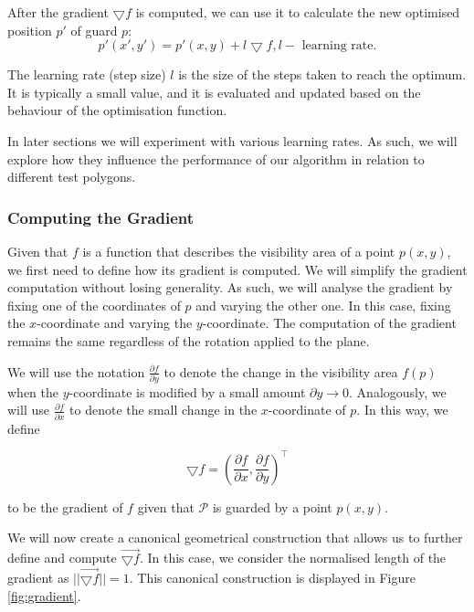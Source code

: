 After the gradient $\bigtriangledown f$ is computed, we can use it to calculate the new optimised position $p'$ of guard $p$: $$p'(x', y') = p'(x, y) + l\bigtriangledown f, l - \text{ learning rate}.$$

The learning rate (step size) $l$ is the size of the steps taken to reach the optimum. It is typically a small value, and it is evaluated and updated based on the behaviour of the optimisation function. 

In later sections we will experiment with various learning rates. As such, we will explore how they influence the performance of our algorithm in relation to different test polygons. 


\subsubsection{Computing the Gradient}

Given that $f$ is a function that describes the visibility area of a point $p(x, y)$, we first need to define how its gradient is computed. We will simplify the gradient computation without losing generality. As such, we will analyse the gradient by fixing one of the coordinates of $p$ and varying the other one. In this case, fixing the $x$-coordinate and varying the $y$-coordinate. The computation of the gradient remains the same regardless of the rotation applied to the plane.


We will use the notation $\frac{\partial f}{\partial y}$ to denote the change in the visibility area $f(p)$ when the $y$-coordinate is modified by a small amount $\partial y \rightarrow 0$. Analogously, we will use $\frac{\partial f}{\partial x}$ to denote the small change in the $x$-coordinate of $p$. In this way, we define 

\begin{equation}
    \bigtriangledown f = (\frac{\partial f}{\partial x}, \frac{\partial f}{\partial y})^\intercal \label{eq:gradient}
\end{equation}

to be the gradient of $f$ given that $\mathcal P$ is guarded by a point $p(x, y)$. 

We will now create a canonical geometrical construction that allows us to further define and compute $\vec{\bigtriangledown f}$. In this case, we consider the normalised length of the gradient as $||\vec{\bigtriangledown f}|| = 1$. This canonical construction is displayed in Figure \ref{fig:gradient}. 

